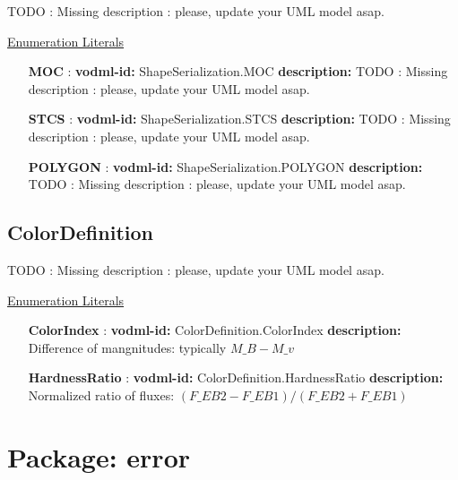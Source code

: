   TODO : Missing description : please, update your UML model asap.

  \noindent \underline{Enumeration Literals}
  \vspace{-\parsep}
  \small
  \begin{itemize}
  
    \item[\textbf{MOC}]: \textbf{vodml-id:} ShapeSerialization.MOC \newline
          \textbf{description:} TODO : Missing description : please, update your UML model asap.
    \item[\textbf{STCS}]: \textbf{vodml-id:} ShapeSerialization.STCS \newline
          \textbf{description:} TODO : Missing description : please, update your UML model asap.
    \item[\textbf{POLYGON}]: \textbf{vodml-id:} ShapeSerialization.POLYGON \newline
          \textbf{description:} TODO : Missing description : please, update your UML model asap.
  \end{itemize}
  \normalsize


  \subsection{ColorDefinition}
  \label{sect:ColorDefinition}

  TODO : Missing description : please, update your UML model asap.

  \noindent \underline{Enumeration Literals}
  \vspace{-\parsep}
  \small
  \begin{itemize}
  
    \item[\textbf{ColorIndex}]: \textbf{vodml-id:} ColorDefinition.ColorIndex \newline
          \textbf{description:} Difference of mangnitudes: typically $M\_B - M\_v$
    \item[\textbf{HardnessRatio}]: \textbf{vodml-id:} ColorDefinition.HardnessRatio \newline
          \textbf{description:} Normalized ratio of fluxes: $(F\_{EB2} - F\_{EB1}) / (F\_{EB2} + F\_{EB1})$
  \end{itemize}
  \normalsize


\pagebreak
\section{Package: error }

